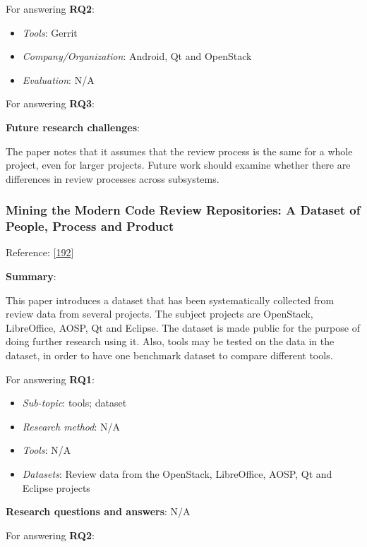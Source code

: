 \documentclass[]{book}
\providecommand{\tightlist}{%
  \setlength{\itemsep}{0pt}\setlength{\parskip}{0pt}}
\begin{document}
For answering \textbf{RQ2}:

\begin{itemize}
\tightlist
\item
  \emph{Tools}: Gerrit
\item
  \emph{Company/Organization}: Android, Qt and OpenStack
\item
  \emph{Evaluation}: N/A
\end{itemize}

For answering \textbf{RQ3}:

\textbf{Future research challenges}:

The paper notes that it assumes that the review process is the same for
a whole project, even for larger projects. Future work should examine
whether there are differences in review processes across subsystems.

\subsubsection{Mining the Modern Code Review Repositories: A Dataset of
People, Process and
Product}\label{mining-the-modern-code-review-repositories-a-dataset-of-people-process-and-product}

Reference: {[}\protect\hyperlink{ref-yang2016mining}{192}{]}

\textbf{Summary}:

This paper introduces a dataset that has been systematically collected
from review data from several projects. The subject projects are
OpenStack, LibreOffice, AOSP, Qt and Eclipse. The dataset is made public
for the purpose of doing further research using it. Also, tools may be
tested on the data in the dataset, in order to have one benchmark
dataset to compare different tools.

For answering \textbf{RQ1}:

\begin{itemize}
\tightlist
\item
  \emph{Sub-topic}: tools; dataset
\item
  \emph{Research method}: N/A
\item
  \emph{Tools}: N/A
\item
  \emph{Datasets}: Review data from the OpenStack, LibreOffice, AOSP, Qt
  and Eclipse projects
\end{itemize}

\textbf{Research questions and answers}: N/A

For answering \textbf{RQ2}:
\end{document}
